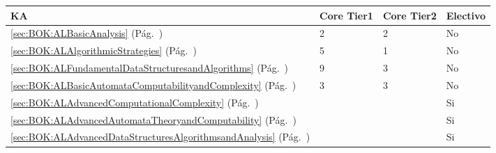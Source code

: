 \begin{center}
\begin{tabularx}{\textwidth}{|X|p{1cm}|p{1cm}|p{1.4cm}|}\hline
\textbf{\acf{KA}} & \textbf{Core Tier1} & \textbf{Core Tier2} & \textbf{Electivo} \\ \hline
\ref{sec:BOK:ALBasicAnalysis} \htmlref{\ALBasicAnalysis}{sec:BOK:ALBasicAnalysis}\xspace (Pág.~\pageref{sec:BOK:ALBasicAnalysis}) & 2 & 2 & No \\ \hline
\ref{sec:BOK:ALAlgorithmicStrategies} \htmlref{\ALAlgorithmicStrategies}{sec:BOK:ALAlgorithmicStrategies}\xspace (Pág.~\pageref{sec:BOK:ALAlgorithmicStrategies}) & 5 & 1 & No \\ \hline
\ref{sec:BOK:ALFundamentalDataStructuresandAlgorithms} \htmlref{\ALFundamentalDataStructuresandAlgorithms}{sec:BOK:ALFundamentalDataStructuresandAlgorithms}\xspace (Pág.~\pageref{sec:BOK:ALFundamentalDataStructuresandAlgorithms}) & 9 & 3 & No \\ \hline
\ref{sec:BOK:ALBasicAutomataComputabilityandComplexity} \htmlref{\ALBasicAutomataComputabilityandComplexity}{sec:BOK:ALBasicAutomataComputabilityandComplexity}\xspace (Pág.~\pageref{sec:BOK:ALBasicAutomataComputabilityandComplexity}) & 3 & 3 & No \\ \hline
\ref{sec:BOK:ALAdvancedComputationalComplexity} \htmlref{\ALAdvancedComputationalComplexity}{sec:BOK:ALAdvancedComputationalComplexity}\xspace (Pág.~\pageref{sec:BOK:ALAdvancedComputationalComplexity}) & ~ & ~ & Si \\ \hline
\ref{sec:BOK:ALAdvancedAutomataTheoryandComputability} \htmlref{\ALAdvancedAutomataTheoryandComputability}{sec:BOK:ALAdvancedAutomataTheoryandComputability}\xspace (Pág.~\pageref{sec:BOK:ALAdvancedAutomataTheoryandComputability}) & ~ & ~ & Si \\ \hline
\ref{sec:BOK:ALAdvancedDataStructuresAlgorithmsandAnalysis} \htmlref{\ALAdvancedDataStructuresAlgorithmsandAnalysis}{sec:BOK:ALAdvancedDataStructuresAlgorithmsandAnalysis}\xspace (Pág.~\pageref{sec:BOK:ALAdvancedDataStructuresAlgorithmsandAnalysis}) & ~ & ~ & Si \\ \hline
\end{tabularx}
\end{center}
